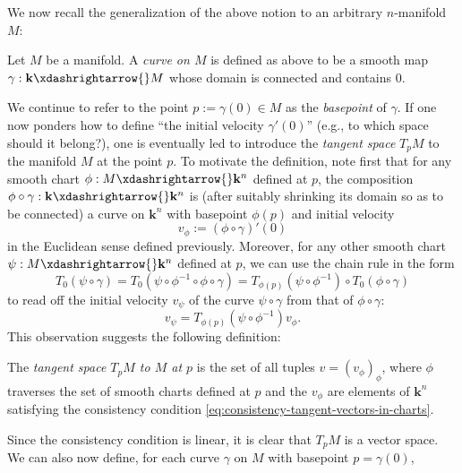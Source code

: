 \documentclass[reqno]{amsart} 
\begin{document}
We now recall the generalization of the above notion to an arbitrary $n$-manifold $M$:
\begin{definition}
Let $M$ be a manifold. 
A \emph{curve on $M$} is defined as above to be a smooth map
$\gamma : \mathbf{k} \xdashrightarrow{} M$ whose domain is connected and contains $0$.
\end{definition}
We continue to refer to the point $p := \gamma(0) \in M$ as
the \emph{basepoint} of $\gamma$. 
If one now ponders
how to define ``the initial velocity $\gamma'(0)$'' (e.g., to which space should it belong?),
one is eventually led to introduce the \emph{tangent space} $T_p M$
to the manifold $M$ at the point $p$.
To motivate the definition, note first that for any smooth chart
$\phi : M \xdashrightarrow{} \mathbf{k}^n$ defined at $p$, the
composition $\phi \circ \gamma : \mathbf{k}  \xdashrightarrow{}
\mathbf{k}^n$ is
(after suitably shrinking its domain so as to be connected)
a curve on $\mathbf{k}^n$ with basepoint $\phi(p)$ and initial
velocity
\begin{equation}\label{eq:velocity-of-curve-in-chart}
  v_\phi := (\phi \circ \gamma)'(0)
\end{equation}
in the Euclidean sense defined previously.
Moreover, for any other smooth chart
$\psi : M \xdashrightarrow{} \mathbf{k}^n$ defined at $p$,
we can use the chain rule
in the form
\begin{equation*}
T_0 (\psi \circ \gamma)
= 
T_0 (\psi \circ \phi^{-1} \circ \phi \circ  \gamma)
=
T_{\phi(p)} (\psi \circ \phi^{-1}) \circ T_{0}(\phi \circ  \gamma)
\end{equation*}
to read off the initial velocity $v_{\psi}$
of the curve $\psi \circ \gamma$
from that of $\phi \circ \gamma$:
\begin{equation}\label{eq:consistency-tangent-vectors-in-charts}
  v_\psi = T_{\phi(p)}(\psi \circ \phi^{-1}) v_\phi.
\end{equation}
This observation suggests the following
definition:
\begin{definition}
  The \emph{tangent space
    $T_p M$ to $M$ at $p$}
  is the set of all tuples $v = (v_\phi)_{\phi}$,
  where $\phi$ traverses the set of smooth charts
  defined at $p$
  and the
  $v_\phi$ are elements of $\mathbf{k}^n$
  satisfying the consistency
  condition \eqref{eq:consistency-tangent-vectors-in-charts}.
\end{definition}
Since the consistency condition is linear,
it is clear that $T_p M$ is a vector space.
We can also now define, for each curve
$\gamma$ on $M$ with basepoint $p = \gamma(0)$,
\end{document}
